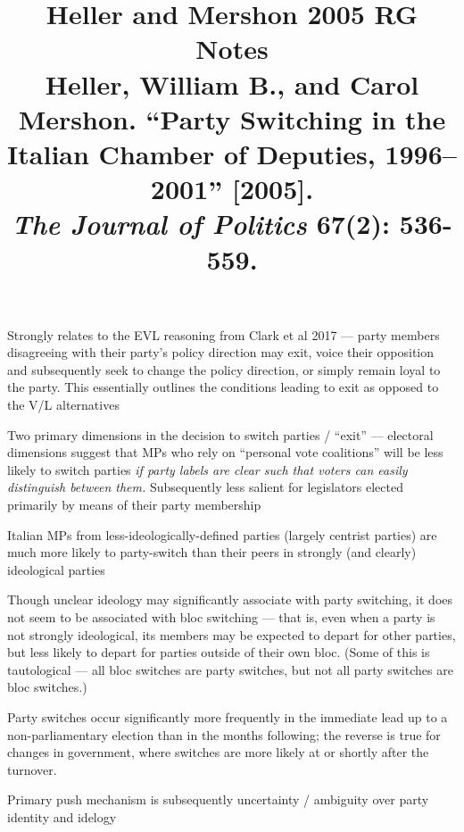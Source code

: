 \documentclass[12pt]{article}
\title{\textbf{Heller and Mershon 2005 RG Notes}\\
\large Heller, William B., and Carol Mershon. ``Party Switching in the Italian Chamber of Deputies, 1996--2001'' [2005].\\
\textit{The Journal of Politics} 67(2): 536-559.}
\author{}
\date{}
\begin{document}
\maketitle

Strongly relates to the EVL reasoning from Clark et al 2017 --- party members disagreeing with their party's policy direction may exit, voice their opposition and subsequently seek to change the policy direction, or simply remain loyal to the party. This essentially outlines the conditions leading to exit as opposed to the V/L alternatives

Two primary dimensions in the decision to switch parties / ``exit'' --- electoral dimensions suggest that MPs who rely on ``personal vote coalitions'' will be less likely to switch parties \textit{if party labels are clear such that voters can easily distinguish between them. }Subsequently less salient for legislators elected primarily by means of their party membership

Italian MPs from less-ideologically-defined parties (largely centrist parties) are much more likely to party-switch than their peers in strongly (and clearly) ideological parties

Though unclear ideology may significantly associate with party switching, it does not seem to be associated with bloc switching --- that is, even when a party is not strongly ideological, its members may be expected to depart for other parties, but less likely to depart for parties outside of their own bloc. (Some of this is tautological --- all bloc switches are party switches, but not all party switches are bloc switches.)

Party switches occur significantly more frequently in the immediate lead up to a non-parliamentary election than in the months following; the reverse is true for changes in government, where switches are more likely at or shortly after the turnover.

Primary push mechanism is subsequently uncertainty / ambiguity over party identity and idelogy
\end{document}
